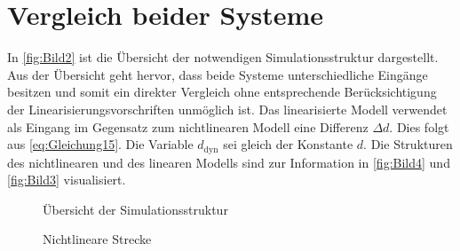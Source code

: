 \section{Vergleich beider Systeme} \label{sec:Vergleich}
In \autoref{fig:Bild2} ist die Übersicht der notwendigen Simulationsstruktur dargestellt. Aus der Übersicht geht hervor, dass beide Systeme unterschiedliche Eingänge besitzen und somit ein direkter Vergleich ohne entsprechende Berücksichtigung der Linearisierungsvorschriften unmöglich ist. Das linearisierte Modell verwendet als Eingang im Gegensatz zum nichtlinearen Modell eine Differenz $\Delta d$. Dies folgt aus \autoref{eq:Gleichung15}. Die Variable $d_{\mathrm{dyn}}$ sei gleich der Konstante $d$. Die Strukturen des nichtlinearen und des linearen Modells sind zur Information in \autoref{fig:Bild4} und \autoref{fig:Bild3} visualisiert.

\begin{figure}[H]
   \centering
   \caption[Übersicht der Simulationsstruktur]{Übersicht der Simulationsstruktur}
   \label{fig:Bild2}
\end{figure}

\begin{figure}[H]
   \centering
   \caption[Nichtlineare Strecke]{Nichtlineare Strecke}
   \label{fig:Bild3}
\end{figure}

